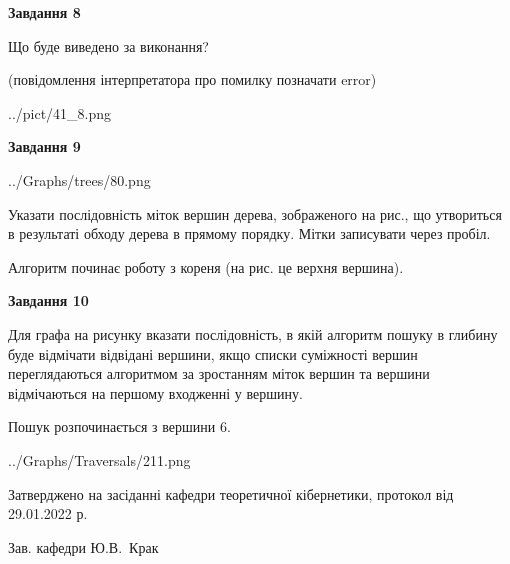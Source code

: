 \documentclass[12pt, ukrainian]{article}
\begin{document}
{\begin {large}
{\begin {center}\textbf{Завдання 8}\end {center}}\par
Що буде виведено за виконання?\par
 (повідомлення інтерпретатора про помилку позначати error)\par
\begin{center}
	{../pict/41_8.png}
\end{center}
\newpage

{\begin {center}\textbf{Завдання 9}\end {center}}\par

\begin{center}
	{../Graphs/trees/80.png}
\end{center}
Указати послідовність міток вершин дерева, зображеного на рис., що утвориться в результаті обходу дерева в прямому порядку. Мітки записувати через пробіл.\par Алгоритм починає роботу з кореня (на рис. це верхня вершина).\par
\newpage

{\begin {center}\textbf{Завдання 10}\end {center}}\par
Для графа на рисунку вказати послідовність, в якій алгоритм пошуку в глибину буде відмічати відвідані вершини, якщо списки суміжності вершин переглядаються алгоритмом за зростанням міток вершин та вершини відмічаються на першому вход\-женні у вершину.\par
Пошук розпочинається з вершини 6.\par

\begin{center}
	{../Graphs/Traversals/211.png}
\end{center}\par
\newpage


\end {large}
}
{\smallskip \begin {small} Затверджено на засіданні кафедри теоретичної кібернетики, протокол  від   29.01.2022 р.\par\smallskip\smallskip
{\parbox {6.5 cm}{Зав. кафедри \dotfill Ю.В.~Крак}} \end{small}}
\end{document}
